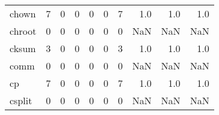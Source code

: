 \begin{tabular}{lrrrrrrrrr}
chown     &                                                  7 &                                                  0 &                                                  0 &                                                  0 &                                                  0 &                                                  7 &                                                1.0 &                                    1.0 &                                  1.0 \\
chroot    &                                                  0 &                                                  0 &                                                  0 &                                                  0 &                                                  0 &                                                  0 &                                                NaN &                                    NaN &                                  NaN \\
cksum     &                                                  3 &                                                  0 &                                                  0 &                                                  0 &                                                  0 &                                                  3 &                                                1.0 &                                    1.0 &                                  1.0 \\
comm      &                                                  0 &                                                  0 &                                                  0 &                                                  0 &                                                  0 &                                                  0 &                                                NaN &                                    NaN &                                  NaN \\
cp        &                                                  7 &                                                  0 &                                                  0 &                                                  0 &                                                  0 &                                                  7 &                                                1.0 &                                    1.0 &                                  1.0 \\
csplit    &                                                  0 &                                                  0 &                                                  0 &                                                  0 &                                                  0 &                                                  0 &                                                NaN &                                    NaN &                                  NaN \\

\end{tabular}

